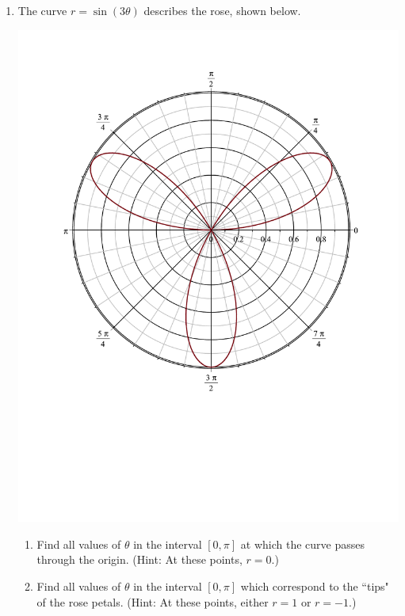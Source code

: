 \documentclass[12pt]{article}
\newif\ifans
\begin{document}
\begin{enumerate}
\item The curve $r=\sin{(3\theta)}$ describes the rose, shown below.
\begin{center}
\includegraphics[scale=0.3]{rose.pdf}
\end{center}

\begin{enumerate}

\item Find all values of $\theta$ in the interval $[0,\pi]$ at which the curve passes through the origin.  (Hint: At these points, $r=0$.)

\ifans\fbox{$\theta=0, \frac{\pi}{3}, \frac{2\pi}{3}, \pi$} \fi

\item Find all values of $\theta$ in the interval $[0,\pi]$ which correspond to the ``tips" of the rose petals.  (Hint: At these points, either $r=1$ or $r=-1$.)

\ifans\fbox{$\theta=\frac{\pi}{6}, \frac{\pi}{2}, \frac{5\pi}{6}$} \fi

\end{enumerate}


\end{enumerate}
\end{document}
